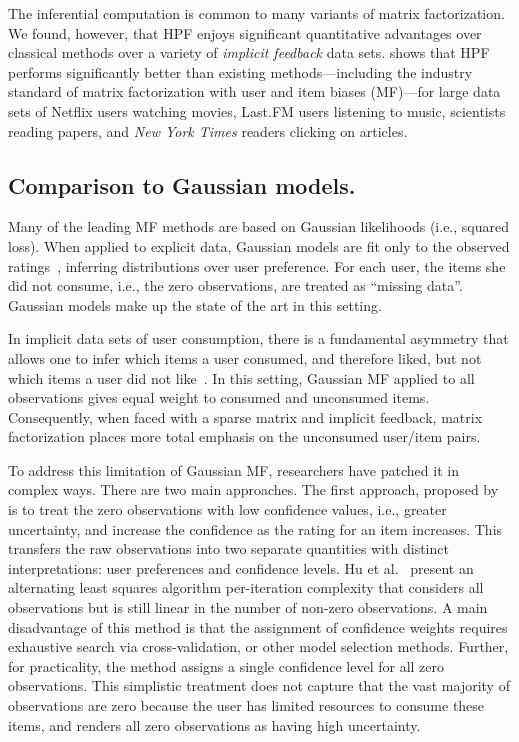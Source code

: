 The inferential computation is common to many variants of matrix
factorization.  We found, however, that HPF enjoys significant
quantitative advantages over classical methods over a variety of
\emph{implicit feedback} data sets.  shows
that HPF performs significantly better than existing
methods---including the industry standard of matrix factorization with
user and item biases (MF)---for large data sets of Netflix users
watching movies, Last.FM users listening to music, scientists reading
papers, and \textit{New York Times} readers clicking on articles.

\subsection{Comparison to Gaussian models.}
Many of the leading MF methods are based on Gaussian likelihoods
(i.e., squared loss). When applied to explicit data, Gaussian models
are fit only to the observed ratings~\cite{Koren:2009}, inferring
distributions over user preference. For each user, the items she did
not consume, i.e., the zero observations, are treated as ``missing
data''. Gaussian models make up the state of the art in this setting.

In implicit data sets of user consumption, there is a fundamental
asymmetry that allows one to infer which items a user consumed, and
therefore liked, but not which items a user did not
like~\cite{Hu:2008p9402}. In this setting, Gaussian MF applied to all
observations gives equal weight to consumed and unconsumed items.
Consequently, when faced with a sparse matrix and implicit feedback,
matrix factorization places more total emphasis on the unconsumed
user/item pairs.

To address this limitation of Gaussian MF, researchers have patched it
in complex ways. There are two main approaches. The first approach,
proposed by \cite{Hu:2008p9402} is to treat the zero observations with
low confidence values, i.e., greater uncertainty, and increase the
confidence as the rating for an item increases. This transfers the raw
observations into two separate quantities with distinct
interpretations: user preferences and confidence levels. Hu et
al.~\cite{Hu:2008p9402} present an alternating least squares algorithm
per-iteration complexity that considers all observations but is still
linear in the number of non-zero observations. A main disadvantage of
this method is that the assignment of confidence weights requires
exhaustive search via cross-validation, or other model selection
methods. Further, for practicality, the method assigns a single
confidence level for all zero observations. This simplistic treatment
does not capture that the vast majority of observations are zero
because the user has limited resources to consume these items, and
renders all zero observations as having high uncertainty.

